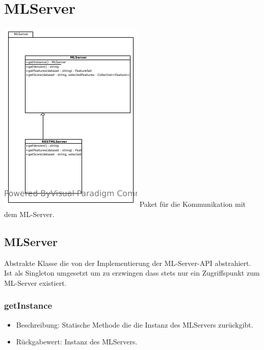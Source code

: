 \documentclass[a4paper]{scrreprt}
\begin{document}
    \section{MLServer}
    \includegraphics[width=\textwidth]{img/package/MLServer.pdf}
    Paket für die Kommunikation mit dem ML-Server.

    \subsection{MLServer}
    Abstrakte Klasse die von der Implementierung der ML-Server-API abstrahiert.
    Ist als Singleton umgesetzt um zu erzwingen dass stets nur ein Zugriffspunkt zum ML-Server existiert.

    \subsubsection{getInstance}
    \begin{itemize}
        \item Beschreibung: Statische Methode die die Instanz des MLServers zurückgibt.
        \item Rückgabewert: Instanz des MLServers.
    \end{itemize}
\end{document}
